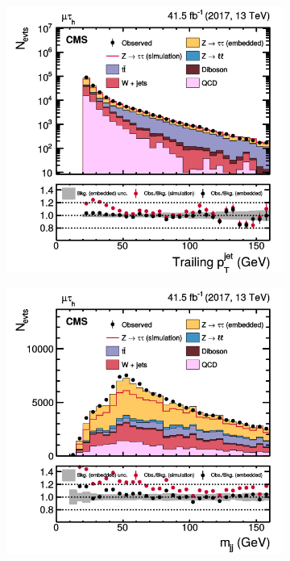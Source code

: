 \begin{figure}[!ht]
\begin{subfigure}[b]{0.33\linewidth}
    \includegraphics[width=\linewidth]{Chapitre4/Images/trailj_embed.png} 
    \caption*{} 
    \vspace{0.5ex}
  \end{subfigure} 
    \begin{subfigure}[b]{0.33\linewidth}
    \centering
    \includegraphics[width=\linewidth]{Chapitre4/Images/mjj_embed.png} 
    \caption*{} 
    \vspace{0.5ex}
  \end{subfigure} 


\end{figure}
